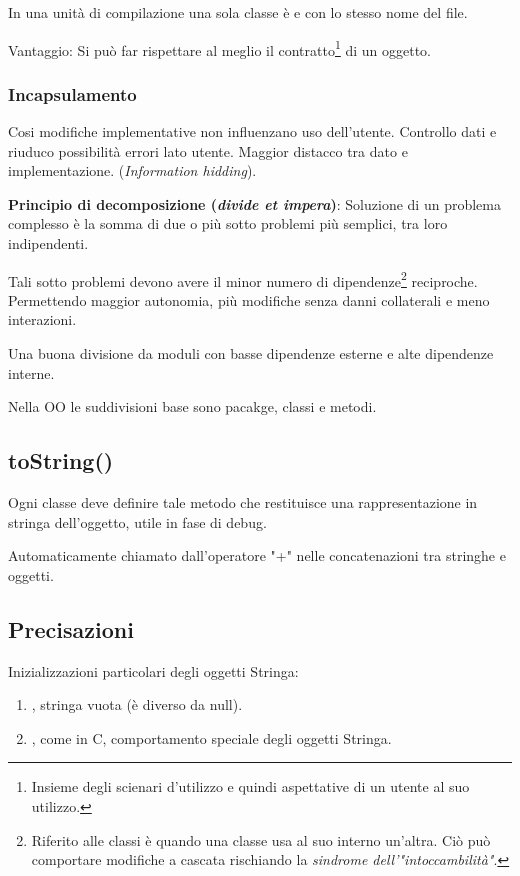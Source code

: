 In una unità di compilazione una sola classe è  e con lo stesso nome del file.

Vantaggio: Si può far rispettare al meglio il contratto\footnote{Insieme degli scienari d'utilizzo e quindi aspettative di un utente al suo utilizzo.} di un oggetto.

\subsubsection{Incapsulamento}

Cosi modifiche implementative non influenzano uso dell'utente. Controllo dati e riuduco possibilità errori lato utente. Maggior distacco tra dato e implementazione. (\textit{Information hidding}).

\bigskip

\textbf{Principio di decomposizione (\textit{divide et impera})}: Soluzione di un problema complesso è la somma di due o più sotto problemi più semplici, tra loro indipendenti.

Tali sotto problemi devono avere il minor numero di dipendenze\footnote{Riferito alle classi è quando una classe usa al suo interno un'altra. Ciò può comportare modifiche a cascata rischiando la \textit{sindrome dell'"intoccambilità"}.} reciproche. Permettendo maggior autonomia, più modifiche senza danni collaterali e meno interazioni.

Una buona divisione da moduli con basse dipendenze esterne e alte dipendenze interne.

Nella OO le suddivisioni base sono pacakge, classi e metodi.

\subsection{toString()}
Ogni classe deve definire tale metodo che restituisce una rappresentazione in stringa dell'oggetto, utile in fase di debug.

Automaticamente chiamato dall'operatore "+" nelle concatenazioni tra stringhe e oggetti.

\subsection{Precisazioni}
Inizializzazioni particolari degli oggetti Stringa:
\begin{enumerate}
	\item {}, stringa vuota (è diverso da null).
	\item {}, come in C, comportamento speciale degli oggetti Stringa.
\end{enumerate}

